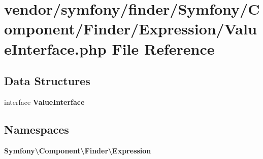 \section{vendor/symfony/finder/\+Symfony/\+Component/\+Finder/\+Expression/\+Value\+Interface.php File Reference}
\label{_value_interface_8php}
\subsection*{Data Structures}
\begin{DoxyCompactItemize}
\item 
interface {\bf Value\+Interface}
\end{DoxyCompactItemize}
\subsection*{Namespaces}
\begin{DoxyCompactItemize}
\item 
 {\bf Symfony\textbackslash{}\+Component\textbackslash{}\+Finder\textbackslash{}\+Expression}
\end{DoxyCompactItemize}
